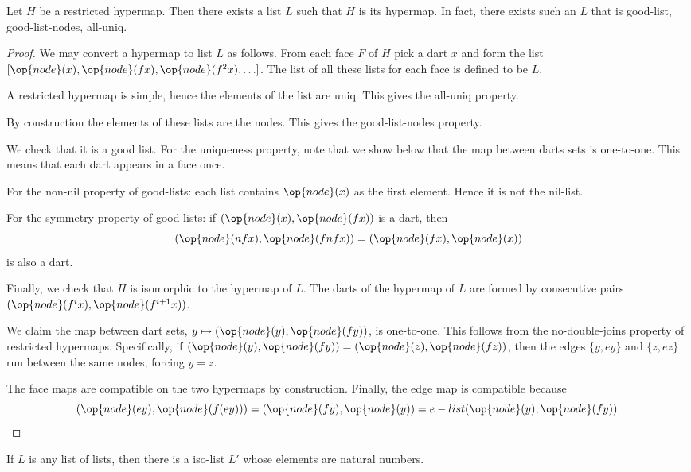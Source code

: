 \begin{lemma}
Let $H$ be a restricted hypermap.  Then there exists a list $L$ such that $H$ is its hypermap.
In fact, there exists such an $L$ that is good-list, good-list-nodes, all-uniq.
\end{lemma}

\begin{proof} We may convert a hypermap to list $L$ as follows.  From each face $F$ of $H$
pick a dart $x$ and form the list $[\op{node}(x),\op{node}(f x),\op{node}(f^2 x),\ldots]$.  
The list of all these lists for each face is defined to be $L$.

A restricted hypermap is simple, hence the elements of the list are uniq.  This gives the all-uniq property.

By construction the elements of these lists are the nodes.  This gives the good-list-nodes property.

We check that it is a good list.  
For the uniqueness property, note that we show below that the map between darts sets is one-to-one.
This means that each dart appears in a face once.

For the non-nil property of good-lists: each list contains $\op{node}(x)$ as the first element. Hence it is
not the nil-list.

For the symmetry property of good-lists: if $(\op{node}(x),\op{node}(f x))$ is a dart, then
\[
(\op{node}(n f x),\op{node}(f n f x)) = (\op{node}(f x),\op{node}(x))
\]
is also a dart.

Finally, we check that $H$ is isomorphic to the hypermap of $L$.  The darts of the hypermap of $L$ are formed by
consecutive pairs $(\op{node}(f^i x),\op{node}(f^{i+1} x))$.  

We claim the map between dart sets, $y\mapsto (\op{node}(y),\op{node}(f y))$, is one-to-one.
This follows from the no-double-joins property of restricted hypermaps.  Specifically,
if $(\op{node}(y),\op{node}(f y)) = (\op{node}(z),\op{node}(f z))$, then the edges $\{y,e y\}$ and $\{z,ez\}$ run
between the same nodes, forcing $y=z$.

The face maps are compatible on the two hypermaps by construction. Finally, the edge map is compatible because
\[
(\op{node}(e y),\op{node}(f (e y))) = (\op{node}(f y),\op{node}(y)) = e-list (\op{node}(y),\op{node}(f y)).
\]
\end{proof}

\begin{lemma}
If $L$ is any list of lists, then there is a iso-list $L'$ whose elements are natural numbers.
\end{lemma}

